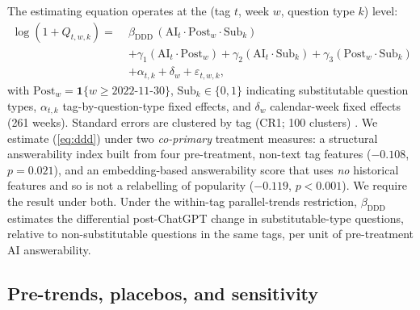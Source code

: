 The estimating equation operates at the
(tag $t$, week $w$, question type $k$) level:
\begin{equation}
\label{eq:ddd}
\begin{aligned}
\log(1+Q_{t,w,k}) =\;& \beta_{\text{DDD}}\,(\text{AI}_t \cdot \text{Post}_w \cdot \text{Sub}_k) \\
& + \gamma_1 (\text{AI}_t \cdot \text{Post}_w) + \gamma_2 (\text{AI}_t \cdot \text{Sub}_k) + \gamma_3 (\text{Post}_w \cdot \text{Sub}_k) \\
& + \alpha_{t,k} + \delta_w + \varepsilon_{t,w,k},
\end{aligned}
\end{equation}
with $\text{Post}_w = \mathbf{1}\{w \geq \text{2022-11-30}\}$,
$\text{Sub}_k \in \{0,1\}$ indicating substitutable question
types, $\alpha_{t,k}$ tag-by-question-type fixed effects, and
$\delta_w$ calendar-week fixed effects (261 weeks). Standard
errors are clustered by tag (CR1; 100 clusters)
\citep{cameron2008wild}. We estimate (\ref{eq:ddd}) under two
\emph{co-primary} treatment measures: a structural answerability
index built from four pre-treatment, non-text tag features
($-0.108$, $p=0.021$), and an embedding-based answerability
score that uses \emph{no} historical features and so is not a
relabelling of popularity ($-0.119$, $p<0.001$). We require the
result under both. Under the within-tag parallel-trends
restriction, $\beta_{\text{DDD}}$ estimates the differential
post-ChatGPT change in substitutable-type questions, relative
to non-substitutable questions in the same tags, per unit of
pre-treatment AI answerability.

\subsection{Pre-trends, placebos, and sensitivity}\label{ssec:id_event_study}\label{ssec:id_honest_did}

